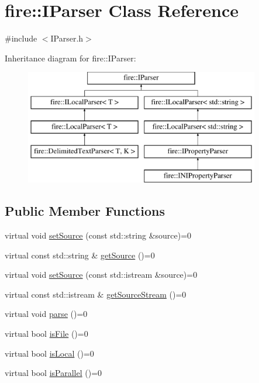 \hypertarget{a00024}{}\section{fire\+:\+:I\+Parser Class Reference}
\label{a00024}


{\ttfamily \#include $<$I\+Parser.\+h$>$}

Inheritance diagram for fire\+:\+:I\+Parser\+:\begin{figure}[H]
\begin{center}
\leavevmode
\includegraphics[height=5.000000cm]{a00024}
\end{center}
\end{figure}
\subsection*{Public Member Functions}
\begin{DoxyCompactItemize}
\item 
virtual void \hyperlink{a00024_a0dbeff2b9bd8dbfb2aad7a424eef87d1}{set\+Source} (const std\+::string \&source)=0
\item 
virtual const std\+::string \& \hyperlink{a00024_ab55d2644dfa6d950d1f874e1e02df095}{get\+Source} ()=0
\item 
virtual void \hyperlink{a00024_a7748a633910e9bfc27411d6bd840496b}{set\+Source} (const std\+::istream \&source)=0
\item 
virtual const std\+::istream \& \hyperlink{a00024_ac94c7a288bf669322b93ba171c43f90e}{get\+Source\+Stream} ()=0
\item 
virtual void \hyperlink{a00024_af36ac6eedd8c27d2f418869193d7d03c}{parse} ()=0
\item 
virtual bool \hyperlink{a00024_a616c42c85d781c916e97f0ad8f1e9010}{is\+File} ()=0
\item 
virtual bool \hyperlink{a00024_a97b9e58493b3cadbc63e670b0b0e759f}{is\+Local} ()=0
\item 
virtual bool \hyperlink{a00024_a83d2882a466d694fb0aea3d846bcbed4}{is\+Parallel} ()=0
\end{DoxyCompactItemize}


